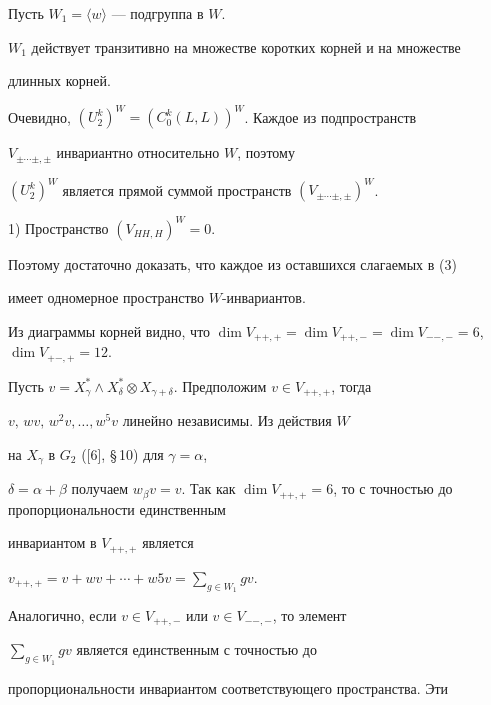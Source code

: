 \begin{pf} Пусть $W_1=\langle w\rangle$ --- подгруппа в $W$.\; 


$W_1$ действует транзитивно на множестве коротких корней и на множестве 


длинных корней. 


Очевидно, $(U^k_2)^W=(C^k_0(L,L))^W$. Каждое из подпространств 


$V_{\pm \dotsb \pm, \pm}$ инвариантно относительно $W$, поэтому 


$(U^k_2)^W$ является прямой суммой пространств $(V_{\pm\dotsb\pm, 


\pm})^W$. 


 


1) Пространство $(V_{HH,H})^W=0$. 


 


Поэтому достаточно доказать, что каждое из оставшихся слагаемых в (3) 


имеет одномерное пространство $W$-инвариантов. 


 


Из диаграммы корней видно, что $\dim V_{++,+}=\dim V_{++,-}=\dim 


V_{--,-}=6$, $\dim V_{+-,+}=12$. 


 


Пусть $v=X_\gamma^*\wedge X_\delta^* 


\otimes X_{\gamma+\delta}$. Предположим $v\in V_{++,+}$, тогда 


$v,\, w v,\, w^2 v,\dotsc, w^5 v$ линейно независимы. Из действия $W$ 


на $X_\gamma$ в $G_2$ ([6], \S\,10) для $\gamma=\alpha$, 


$\delta=\alpha+\beta$ получаем $w_\beta v=v$. Так как $\dim 


V_{++,+}=6$, то с точностью до пропорциональности единственным 


инвариантом в $V_{++,+}$ является 


$v_{++,+}=v+wv+\dotsb+w5v=\sum\limits_{g\in W_1}g v$. 


 


Аналогично, если $v\in V_{++,-}$ или $v\in V_{--,-}$, то элемент 


$\sum\limits_{g\in W_1}gv$ является единственным с точностью до 


пропорциональности инвариантом соответствующего пространства. Эти 



\end{pf}
